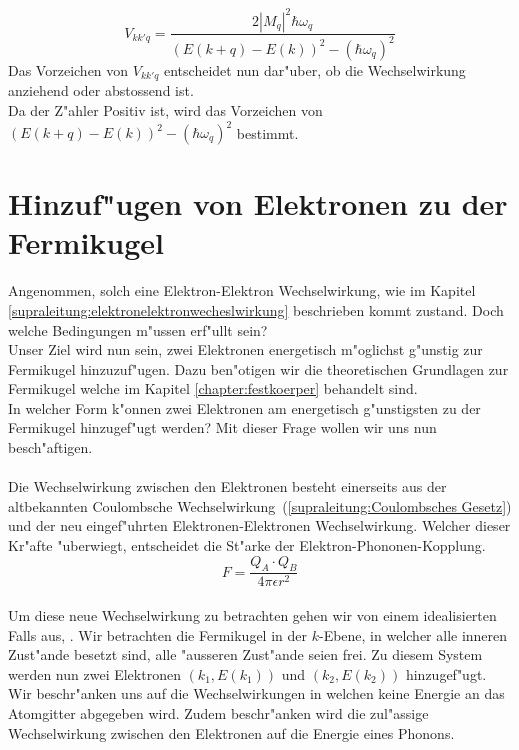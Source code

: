 \begin{refsection}
\begin{equation}
V_{kk'q} =
\frac
{2|M_q|^2\hbar\omega_q}
{(E(k+q)-E(k))^2-(\hbar\omega_q)^2}
\label{supraleitung:Wechelwirkung_Vkk'q_Kurz}
\end{equation}
Das Vorzeichen von $V_{kk'q}$ entscheidet nun dar"uber, ob die Wechselwirkung anziehend oder abstossend ist.\\
Da der Z"ahler Positiv ist, wird das Vorzeichen von $(E(k+q)-E(k))^2-(\hbar\omega_q)^2$ bestimmt.


\section{Hinzuf"ugen von Elektronen zu der Fermikugel}
Angenommen, solch eine Elektron-Elektron Wechselwirkung, wie im Kapitel \ref{supraleitung:elektronelektronwecheslwirkung} beschrieben kommt zustand. Doch welche Bedingungen m"ussen erf"ullt sein?
\\
Unser Ziel wird nun sein, zwei Elektronen energetisch m"oglichst g"unstig zur Fermikugel hinzuzuf"ugen. Dazu ben"otigen wir die theoretischen Grundlagen zur Fermikugel welche im Kapitel \ref{chapter:festkoerper} behandelt sind.
\\
In welcher Form k"onnen zwei Elektronen am energetisch g"unstigsten zu der Fermikugel hinzugef"ugt werden? Mit dieser Frage wollen wir uns nun besch"aftigen.
\\
\\
Die Wechselwirkung zwischen den Elektronen besteht einerseits aus der altbekannten Coulombsche Wechselwirkung~(\ref{supraleitung:Coulombsches Gesetz}) und der neu eingef"uhrten Elektronen-Elektronen Wechselwirkung. Welcher dieser Kr"afte "uberwiegt, entscheidet die St"arke der Elektron-Phononen-Kopplung.
\\
\begin{equation}
F=\frac{Q_A\cdot Q_B}{4\pi\epsilon r^2}
\label{supraleitung:Coulombsches Gesetz}
\end{equation}
\\
Um diese neue Wechselwirkung zu betrachten gehen wir von einem idealisierten Falls aus, 
. 
Wir betrachten die Fermikugel in der $k$-Ebene, in welcher alle inneren Zust"ande besetzt sind, alle "ausseren Zust"ande seien frei. Zu diesem System werden nun zwei Elektronen $(k_1,E(k_1))$ und $(k_2,E(k_2))$ hinzugef"ugt. Wir beschr"anken uns auf die Wechselwirkungen in welchen keine Energie an das Atomgitter abgegeben wird. Zudem beschr"anken wird die zul"assige Wechselwirkung zwischen den Elektronen auf die Energie eines Phonons.


\end{refsection}
